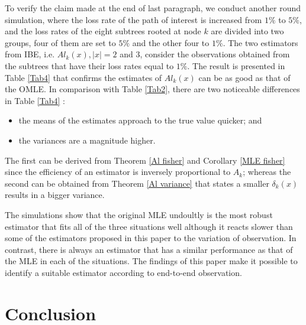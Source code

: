 \documentclass[10pt,onecolumn]{IEEEtran}
\begin{document}
To verify the claim made at the end of last paragraph, we  conduct another round simulation, where the loss rate of the path of interest is increased from $1\%$ to $5\%$, and the loss rates of the eight subtrees rooted at node $k$ are divided into two groups, four of them are set to $5\%$ and the other four to $1\%$.  The two estimators from IBE, i.e. $Al_k(x), |x|=2$ and $3$, consider the observations obtained from the subtrees that have their loss rates equal to $1\%$. The result is presented in Table \ref{Tab4} that confirms the estimates of $Al_k(x)$ can be as good as that of the OMLE.  In comparison with
Table \ref{Tab2}, there are two noticeable differences in Table \ref{Tab4} :
 \begin{itemize}
 \item the means of the estimates approach to the true value quicker; and
 \item the  variances are a magnitude higher.
  \end{itemize}
The first can be derived from Theorem \ref{Al fisher}  and Corollary \ref{MLE fisher} since the efficiency of an estimator is inversely proportional to $A_k$; whereas the second can be obtained from  Theorem \ref{Al variance} that states a smaller $\delta_k(x)$ results in a bigger variance.



The simulations show that the original MLE undoultly is the most robust estimator that fits all of the three situations well although it reacts slower than some of the estimators proposed in this paper to the variation of observation. In contrast,  there is always an estimator that has a similar performance as that of the MLE in each of the situations. 
 The findings of this paper make it  possible to identify a suitable estimator according to end-to-end observation.















\section{Conclusion}\label{section7}
\end{document}
